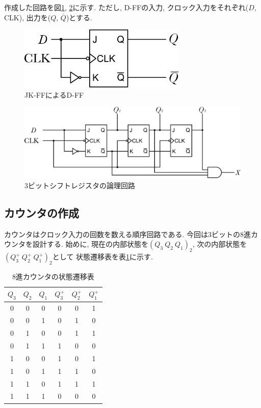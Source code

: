 \documentclass[titlepage]{jsarticle}
\begin{document}
    作成した回路を図\ref{fig:JK-FF_by_D-FF}, \ref{fig:shift_register}に示す.
    ただし, D-FFの入力, クロック入力をそれぞれ($D$, CLK), 出力を($Q$, $\overline{Q}$)とする.

    \begin{figure}[h]
      \centering
      \includegraphics[width=8cm]{images/d_w_jk.pdf}
      \caption{JK-FFによるD-FF}
      \label{fig:JK-FF_by_D-FF}
    \end{figure}
    \begin{figure}[h]
      \centering
      \includegraphics[width=15cm]{images/shift.pdf}
      \caption{3ビットシフトレジスタの論理回路}
      \label{fig:shift_register}
    \end{figure}
  \subsection{カウンタの作成}
    カウンタはクロック入力の回数を数える順序回路である.
    今回は3ビットの8進カウンタを設計する.
    始めに, 現在の内部状態を$(Q_3 \ Q_2 \ Q_1)_2$, 次の内部状態を$(Q_3^+ \ Q_2^+ \ Q_1^+)_2$として
    状態遷移表を表\ref{tab:counter}に示す.
    \begin{table}[h]
      \caption{8進カウンタの状態遷移表}
      \label{tab:counter}
      \centering
      \begin{tabular}{ccc||ccc}
        \hline
        $Q_3$ & $Q_2$ & $Q_1$ & $Q_3^+$ & $Q_2^+$ & $Q_1^+$ \\ \hline \hline
        0 & 0 & 0 & 0 & 0 & 1 \\
        0 & 0 & 1 & 0 & 1 & 0 \\
        0 & 1 & 0 & 0 & 1 & 1 \\
        0 & 1 & 1 & 1 & 0 & 0 \\
        1 & 0 & 0 & 1 & 0 & 1 \\
        1 & 0 & 1 & 1 & 1 & 0 \\
        1 & 1 & 0 & 1 & 1 & 1 \\
        1 & 1 & 1 & 0 & 0 & 0 \\ \hline
      \end{tabular}
    \end{table}
\end{document}
